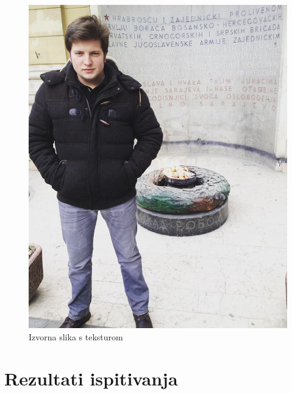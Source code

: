 \documentclass[times, utf8, seminar, numeric]{fer}
\begin{document}
\begin{center}

\begin{figure}[ht]
	\caption{Izvorna slika s teksturom}
	\label{pattern_original}
	\centerline{
	\includegraphics[scale=0.4]{../benchmark_results/pattern/original_image.png}	
	}
\end{figure}
\end{center}

\section{Rezultati ispitivanja}
\end{document}
